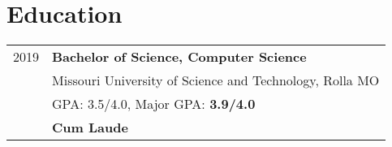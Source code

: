 \documentclass[a4paper,10pt]{article}
\begin{document}
\section{Education}
\begin{tabular}{r p{15cm}}
  \textsc{2019} & \textbf{Bachelor of Science, Computer Science} \\
                & Missouri University of Science and Technology, Rolla MO  \\
                & GPA: 3.5/4.0, Major GPA: \textbf{3.9/4.0} \\
                & \textbf{Cum Laude} \\
\end{tabular}
\end{document}
